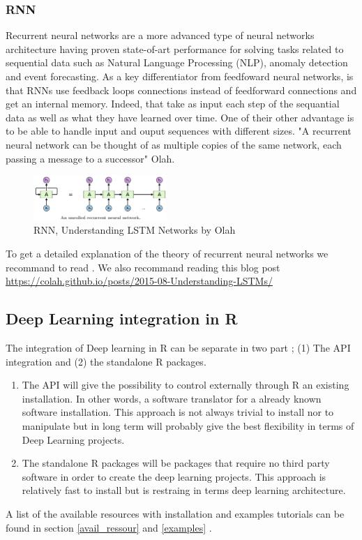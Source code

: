 \documentclass[letter]{article}\usepackage[]{graphicx}\usepackage[]{color}
\newcommand{\ntodo}[2][]{\todo[#1]{\thesubsubsection{}. #2}}
\begin{document}
\subsubsection{RNN}
\ntodo[inline]{Add more info about this topics}
Recurrent neural networks are a more advanced type of neural networks architecture having proven state-of-art performance for solving tasks related to sequential data such as Natural Language Processing (NLP), anomaly detection and event forecasting. As a key differentiator from feedfoward neural networks, is that RNNs use feedback loops connections instead of feedforward connections and get an internal memory. Indeed, that take as input each step of the sequantial data as well as what they have learned over time. One of their other advantage is to be able to handle input and ouput sequences with different sizes. "A recurrent neural network can be thought of as multiple copies of the same network, each passing a message to a successor" Olah.
\begin{figure}[h]
    \centering
    \includegraphics[width=0.45\textwidth]{figure/RNN_process.png}
     \caption{RNN, Understanding LSTM Networks by Olah}
     \label{fig:rnn_process}
\end{figure}

To get a detailed explanation of the theory of recurrent neural networks we recommand to read \cite[Chapter 10]{Goodfellow-et-al-2016}. We also recommand reading this blog post \url{https://colah.github.io/posts/2015-08-Understanding-LSTMs/}

\subsection{Deep Learning integration in R}
The integration of Deep learning in R can be separate in two part ; (1) The API integration and (2) the standalone R packages. 
\begin{enumerate}
\item The API will give the possibility to control externally through R an existing installation. In other words, a software translator for a already known software installation. This approach is not always trivial to install nor to manipulate but in long term will probably give the best flexibility in terms of Deep Learning projects.
\item The standalone R packages will be packages that require no third party software in order to create the deep learning projects. This approach is relatively fast to install but is restraing in terms deep learning architecture.
\end{enumerate}
A list of the available resources with installation and examples tutorials can be found in section \ref{avail_ressour} and \ref{examples} .
\end{document}
